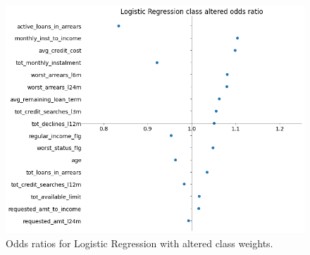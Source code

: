 \begin  {figure}[!htpb]
\centering
  \includegraphics[width=0.8\linewidth]{Credit_Images/LR__ALTERED_ODDS.png}
   \caption{Odds ratios for Logistic Regression with altered class weights.}
    \label{fig-odds-weighted}
\end{figure}




